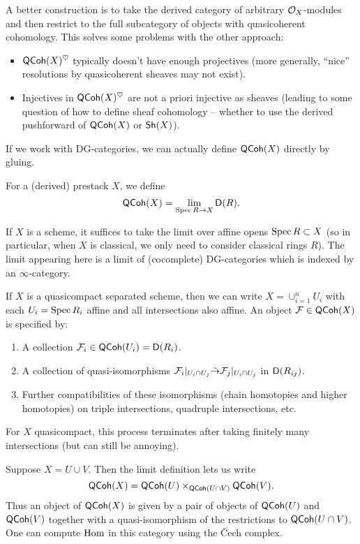 \documentclass{amsart}
\begin{document}
A better construction is to take the derived category of arbitrary $\mathcal{O}_X$-modules and then restrict to the full subcategory of objects with quasicoherent cohomology.
This solves some problems with the other approach: 
\begin{itemize}
	\item $\mathsf{QCoh}(X)^\heartsuit$ typically doesn't have enough projectives (more generally, ``nice'' resolutions by quasicoherent sheaves may not exist).
	\item Injectives in $\mathsf{QCoh}(X)^\heartsuit$ are not a priori injective as sheaves (leading to some question of how to define sheaf cohomology -- whether to use the derived pushforward of $\mathsf{QCoh}(X)$ or $\mathsf{Sh}(X)$).
\end{itemize}

If we work with DG-categories, we can actually define $\mathsf{QCoh}(X)$ directly by gluing.

\begin{dfn}
	For a (derived) prestack $X$, we define
	\[
		\mathsf{QCoh}(X) = \lim_{\operatorname{Spec} R \to X} \mathsf{D}(R).
	\]
\end{dfn}

If $X$ is a scheme, it suffices to take the limit over affine opens $\operatorname{Spec} R \subset X$ (so in particular, when $X$ is classical, we only need to consider classical rings $R$).
The limit appearing here is a limit of (cocomplete) DG-categories which is indexed by an $\infty$-category.

\begin{ex}
	If $X$ is a quasicompact separated scheme, then we can write $X = \cup_{i=1}^n U_i$ with each $U_i = \operatorname{Spec} R_i$ affine and all intersections also affine.
	An object $\mathcal{F} \in \mathsf{QCoh}(X)$ is specified by:
	\begin{enumerate}
		\item A collection $\mathcal{F}_i \in \mathsf{QCoh}(U_i) = \mathsf{D}(R_i)$.
		\item A collection of quasi-isomorphisms $\mathcal{F}_i |_{U_i \cap U_j} \tilde{\to} \mathcal{F}_j |_{U_i \cap U_j}$ in $\mathsf{D}(R_{ij})$.
		\item Further compatibilities of these isomorphisms (chain homotopies and higher homotopies) on triple intersections, quadruple intersections, etc.
	\end{enumerate}
	For $X$ quasicompact, this process terminates after taking finitely many intersections (but can still be annoying).
\end{ex}

\begin{ex}
	Suppose $X = U \cup V$.
	Then the limit definition lets us write
	\[
		\mathsf{QCoh}(X) = \mathsf{QCoh}(U) \times_{\mathsf{QCoh}(U \cap V)} \mathsf{QCoh}(V).
	\]
	Thus an object of $\mathsf{QCoh}(X)$ is given by a pair of objects of $\mathsf{QCoh}(U)$ and $\mathsf{QCoh}(V)$ together with a quasi-isomorphism of the restrictions to $\mathsf{QCoh}(U \cap V)$.
	One can compute $\operatorname{Hom}$ in this category using the \v{C}ech complex.
\end{ex}
\end{document}
